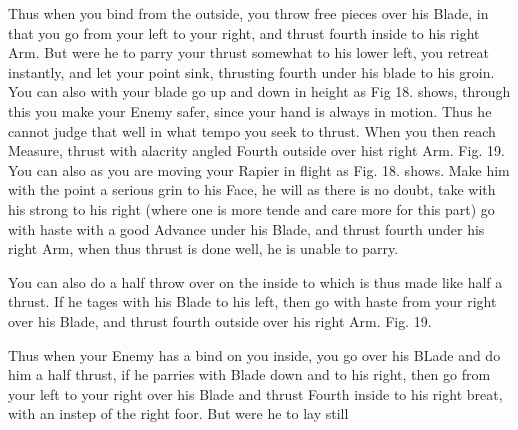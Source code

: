 Thus when you bind from the outside, you throw free pieces over his
Blade, in that you go from your left to your right, and thrust fourth
inside to his right Arm. But were he to parry your thrust somewhat to
his lower left, you retreat instantly, and let your point sink,
thrusting fourth under his blade to his groin. You can also with your
blade go up and down in height as Fig 18. shows, through this you make
your Enemy safer,
since your hand is always in motion. Thus he cannot judge that well in
what tempo you seek to thrust. When you then reach Measure, thrust
with alacrity angled Fourth outside over hist right Arm. Fig. 19. You
can also as you are moving your Rapier in flight as
Fig. 18. shows. Make him with the point a serious grin to his Face, he
will as there is no doubt, take with his strong to his right (where
one is more tende and care more for this part) go with haste with a
good Advance under his Blade, and thrust fourth under his right Arm,
when thus thrust is done well, he is unable to parry.

\exercise{}


You can also do a half throw over on the inside to which is thus made
like half a thrust. If he tages with his Blade to his left, then go
with haste from your right over his Blade, and thrust fourth outside
over his right Arm. Fig. 19.

\exercise{}


Thus when your Enemy has a bind on you inside, you go over his BLade
and do him a half thrust, if he parries with Blade down and to his
right, then go from your left to your right over his Blade and thrust
Fourth inside to his right breat, with an instep of the right
foor. But were he to lay still
